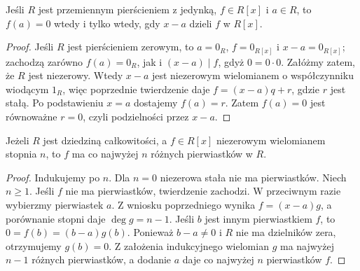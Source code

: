 \begin{wniosek}
\label{aa:wn:poly-factor}
Jeśli $R$ jest przemiennym pierścieniem z jedynką,
$f\in R[x]$ i $a\in R$, to $f(a)=0$ wtedy i tylko wtedy,
gdy $x-a$ dzieli $f$ w $R[x]$.
\end{wniosek}
\begin{proof}
Jeśli $R$ jest pierścieniem zerowym, to $a=0_R$,
$f=0_{R[x]}$ i $x-a=0_{R[x]}$; zachodzą zarówno
$f(a)=0_R$, jak i $(x-a)\mid f$, gdyż $0=0\cdot0$. Załóżmy zatem,
że $R$ jest niezerowy. Wtedy $x-a$ jest niezerowym
wielomianem o współczynniku wiodącym $1_R$,
więc poprzednie twierdzenie daje $f=(x-a)q+r$,
gdzie $r$ jest stałą. Po podstawieniu $x=a$ dostajemy
$f(a)=r$. Zatem $f(a)=0$ jest równoważne $r=0$,
czyli podzielności przez $x-a$.
\end{proof}

\begin{twierdzenie}
\label{aa:tw:poly-roots}
Jeżeli $R$ jest dziedziną całkowitości, a
$f\in R[x]$ niezerowym wielomianem stopnia $n$, to
$f$ ma co najwyżej $n$ różnych pierwiastków w $R$.
\end{twierdzenie}
\begin{proof}
Indukujemy po $n$. Dla $n=0$ niezerowa stała
nie ma pierwiastków. Niech $n\ge1$. Jeśli $f$ nie ma
pierwiastków, twierdzenie zachodzi. W przeciwnym razie
wybierzmy pierwiastek $a$. Z wniosku poprzedniego wynika
$f=(x-a)g$, a porównanie stopni daje $\deg g=n-1$.
Jeśli $b$ jest innym pierwiastkiem $f$, to
$0=f(b)=(b-a)g(b)$. Ponieważ $b-a\ne0$ i $R$ nie
ma dzielników zera, otrzymujemy $g(b)=0$.
Z założenia indukcyjnego wielomian $g$ ma najwyżej
$n-1$ różnych pierwiastków, a dodanie $a$ daje
co najwyżej $n$ pierwiastków $f$.
\end{proof}


